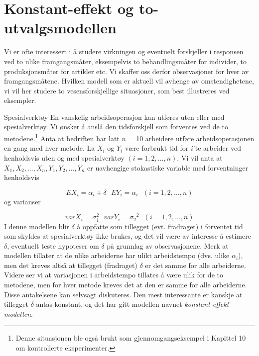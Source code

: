 \section{Konstant-effekt og to-utvalgsmodellen}
Vi er ofte interessert i å studere virkningen og eventuelt forskjeller
i responsen ved to ulike framgangsmåter, eksempelvis to 
behandlingsmåter for individer, to produksjonsmåter for artikler
etc.  Vi skaffer oss derfor observasjoner for hver av framgangsmåtene.
Hvilken modell som er aktuell vil avhenge av omstendighetene, vi vil her
studere to vesensforskjellige situa\-sjoner, som best illustreres ved
eksempler.\\

\begin{eksempel}{Spesialverktøy}
En vanskelig arbeidsoperasjon kan utføres uten eller med
spesialverktøy. 
Vi ønsker å anslå den tidsforskjell som forventes ved de to
metodene.\footnote{Denne situasjonen ble også brukt som
gjennomgangseksempel i Kapittel 10 om kontrollerte eksperimenter.}
Anta at bedriften har latt $n$ = 10 arbeidere utføre
arbeidsoperasjonen en gang med hver metode.  La $X_i$ og $Y_i$ være
forbrukt tid for $i$'te arbeider ved henholdsvis uten og med
spesialverktøy $(i = 1, 2, \ldots, n).$  Vi vil anta at $X_1, X_2,
\ldots, X_n, Y_1, Y_2, \ldots, Y_n$ er uavhengige stokastiske variable
med forventninger henholdsvis

\[ EX_i = {\alpha}_i +\delta \mbox{\ \ \ } EY_i = {\alpha}_i
                                    \mbox{\ \ \ }  (i = 1, 2, \ldots, n)\]
\noindent og varianser

\[ varX_i = {\sigma}_1^2 \mbox{\ \ \ }  varY_i = {\sigma_2}^2 
                                    \mbox{\ \ \ } (i = 1, 2, \ldots, n)\]
I denne modellen blir $\delta$ å oppfatte som tillegget (evt. fradraget)
i forventet tid som skyldes at spesialverktøy ikke brukes, og det vil
være av interesse å estimere $\delta$, eventuelt teste hypoteser om 
$\delta$ på grunnlag av observasjonene.  Merk at modellen tillater at 
de ulike arbeiderne har ulikt arbeidstempo (dvs. ulike $\alpha_i$), men 
det kreves altså at tillegget (fradraget) $\delta$ er det samme for
alle arbeiderne.  Videre ser vi at variasjonen i arbeidstempo tillates å
være ulik for de to metodene, men for hver metode kreves det at den
er samme for alle arbeiderne.  Disse antakelsene kan selvsagt diskuteres.
Den mest interessante er kanskje at tillegget $\delta$ antas konstant,
og det har gitt modellen navnet {\em konstant-effekt modellen}.
\end{eksempel}

